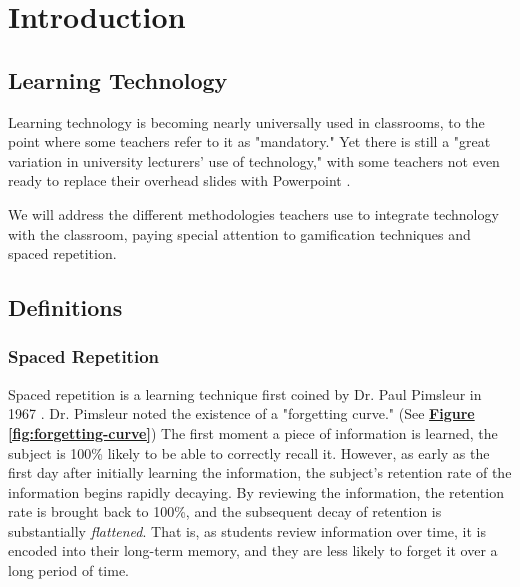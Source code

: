 \chapter{Introduction}

\section{Learning Technology}


\par Learning technology is becoming nearly universally used in classrooms, to the point where some teachers refer to it as "mandatory." Yet there is still a "great variation in university lecturers' use of technology," with some teachers not even ready to replace their overhead slides with Powerpoint \cite{BJET:BJET12051}.

\par We will address the different methodologies teachers use to integrate technology with the classroom, paying special attention to gamification techniques and spaced repetition.

\section{Definitions}

\subsection{Spaced Repetition}
\par Spaced repetition is a learning technique first coined by Dr. Paul Pimsleur in 1967 \cite{pimsleur1967memory}. Dr. Pimsleur noted the existence of a "forgetting curve." (See \textbf{\hyperref[fig:forgetting-curve]{Figure \ref*{fig:forgetting-curve}}}) The first moment a piece of information is learned, the subject is 100\% likely to be able to correctly recall it. However, as early as the first day after initially learning the information, the subject's retention rate of the information begins rapidly decaying. By reviewing the information, the retention rate is brought back to 100\%, and the subsequent decay of retention is substantially \textit{flattened}. That is, as students review information over time, it is encoded into their long-term memory, and they are less likely to forget it over a long period of time.

